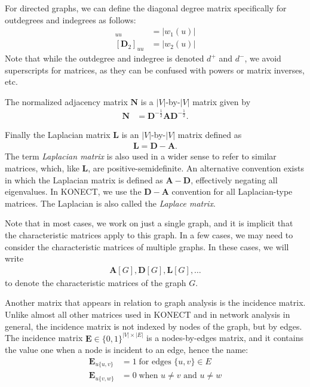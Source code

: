 \documentclass{article}
\begin{document}
For directed graphs, we can define the diagonal degree matrix
specifically for outdegrees and indegrees as follows:
\begin{align}
  [\mathbf D_1]_{uu} &= |w_1(u)| \\
  [\mathbf D_2]_{uu} &= |w_2(u)| 
\end{align}
Note that while the outdegree and indegree is denoted $d^+$ and $d^-$, we
avoid superscripts for matrices, as they can be confused with powers or
matrix inverses, etc. 

The normalized adjacency matrix $\mathbf N$ is a $|V|$-by-$|V|$ matrix
given by
\begin{align}
  \mathbf N &= \mathbf D^{-\frac 12} \mathbf A \mathbf D^{-\frac 12}. 
\end{align}

Finally the Laplacian matrix $\mathbf L$ is an $|V|$-by-$|V|$ matrix
defined as
\begin{align}
  \mathbf L = \mathbf D - \mathbf A. 
\end{align}
The term \emph{Laplacian matrix} is also used in a wider sense to refer
to similar matrices, which, like $\mathbf L$, are
positive-semidefinite.  An alternative convention exists in which the
Laplacian matrix is defined as $\mathbf A - \mathbf D$, effectively
negating all eigenvalues.  In KONECT, we use the $\mathbf D - \mathbf A$
convention for all Laplacian-type matrices.  The Laplacian is also
called the \emph{Laplace matrix}. 

Note that in most cases, we work on just a single graph, and it is
implicit that the characteristic matrices apply to this graph.  In a few
cases, we may need to consider the characteristic matrices of multiple
graphs.  In these cases, we will write
\begin{align*}
  \mathbf A[G], \mathbf D[G], \mathbf L[G], \dotsc
\end{align*}
to denote the characteristic matrices of the graph $G$. 

Another matrix that appears in relation to graph analysis is the
incidence matrix.  Unlike almost all other matrices used in KONECT and
in network analysis in general, the incidence matrix is not indexed by
nodes of the graph, but by edges.  The incidence matrix $\mathbf E \in
\{0,1\}^{|V|\times|E|}$ is a nodes-by-edges matrix, and it contains the
value one when a node is incident to an edge, hence the name:
\begin{align*}
  \mathbf E_{u \{u,v\}} &= 1 \;\text{for edges $\{u,v\} \in E$} \\
  \mathbf E_{u \{v,w\}} &= 0 \;\text{when $u \neq v$ and $u \neq w$}
\end{align*}
\end{document}
